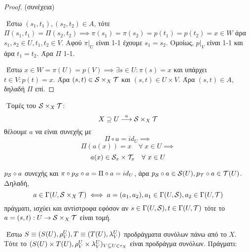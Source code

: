 \vspace*{0.3cm}

\begin{proof} (συνέχεια)

    $ $\newline
    Έστω $(s_1,t_1),(s_2,t_2) \in A$, τότε $\Pi(s_1,t_1) = \Pi(s_2,t_2) \implies \pi(s_1) = \pi(s_2) = p(t_1) = p(t_2) = x \in W$ άρα $s_1,s_2 \in U, t_1,t_2 \in V$. Αφού $\pi|_U$ είναι 1-1 έχουμε $s_1 = s_2$. Ομοίως, $p|_V$ είναι 1-1 και άρα $t_1 = t_2$. Άρα $\Pi$ 1-1.

    $ $\newline
    Έστω $x \in W = \pi (U) = p(V) \implies \exists s \in U: \pi(s) = x$ και υπάρχει $t\in V: p(t) = x$. Άρα $(s,t) \in \mathcal{S}\times_X \mathcal{T}$ και $(s,t) \in U\times V$. Άρα $(s,t) \in A$, δηλαδή $\Pi$ επί.
\end{proof}

$ $\newline
Τομές του $\mathcal{S} \times_X \mathcal{T}$:
$$X \supseteq U \overset{a}{\longrightarrow} \mathcal{S} \times_X \mathcal{T}$$ θέλουμε $a$ να είναι συνεχής με
$$\Pi \circ a = id_U \implies $$
$$\Pi(a(x))=x \quad \forall \ x \in U \implies $$
$$a(x) \in \mathcal{S}_x \times \mathcal{T}_x \quad \forall \ x \in U$$

\begin{figure}[H]
    \centering
\end{figure}

\noindent $p_{\mathcal{S}}\circ a$ συνεχής και $\pi \circ p_{\mathcal{S}}\circ a = \Pi \circ a = id_U$, άρα $p_{\mathcal{S}} \circ a \in \mathcal{S} (U), p_{\mathcal{T}}\circ a \in \mathcal{T}(U)$. Δηλαδή,
$$a \in \Gamma(U,\mathcal{S} \times_X \mathcal{T}) \iff a = (a_1,a_2), a_1 \in \Gamma(U,\mathcal{S}),a_2 \in \Gamma(U,\mathcal{T})$$ πράγματι, ισχύει και αντίστροφα εφόσον αν $s \in \Gamma(U,\mathcal{S}), t \in \Gamma(U,\mathcal{T})$ τότε το $a = (s,t): U \rightarrow \mathcal{S} \times_X \mathcal{T}$ είναι τομή.

$ $\newline
Έστω $S\equiv (S(U),\rho^U_V), T\equiv (T(U),\lambda^U_V)$ προδράγματα συνόλων πάνω από το $X$. Τότε το $(S(U)\times T(U),\rho^U_V \times \lambda^U_V)_{V\subseteq U \in \tau_X}$ είναι προδράγμα συνόλων. Πράγματι:

